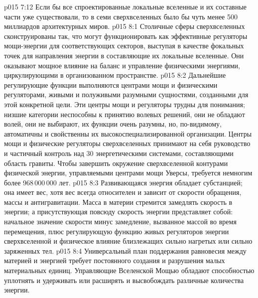 \vs p015 7:12 \pc Если бы все спроектированные локальные вселенные и их составные части уже существовали, то в семи сверхвселенных было бы чуть менее 500 миллиардов архитектурных миров.
\vs p015 8:1 Столичные сферы сверхвселенных сконструированы так, что могут функционировать как эффективные регуляторы мощи\hyp{}энергии для соответствующих секторов, выступая в качестве фокальных точек для направления энергии в составляющие их локальные вселенные. Они оказывают мощное влияние на баланс и управление физическими энергиями, циркулирующими в организованном пространстве.
\vs p015 8:2 Дальнейшие регулирующие функции выполняются центрами мощи и физическими регуляторами, живыми и полуживыми разумными сущностями, созданными для этой конкретной цели. Эти центры мощи и регуляторы трудны для понимания; низшие категории неспособны к принятию волевых решений, они не обладают волей, они не выбирают, их функции очень разумны, но, по\hyp{}видимому, автоматичны и свойственны их высокоспециализированной организации. Центры мощи и физические регуляторы сверхвселенных принимают на себя руководство и частичный контроль над 30 энергетическими системами, составляющими область гравиты. Чтобы завершить окружение сверхвселенной контурами физической энергии, управляемыми центрами мощи Уверсы, требуется немногим более 968\,000\,000 лет.
\vs p015 8:3 \pc Развивающаяся энергия обладает субстанцией; она имеет вес, хотя вес всегда относителен и зависит от скорости обращения, массы и антигравитации. Масса в материи стремится замедлять скорость в энергии; а присутствующая повсюду скорость энергии представляет собой: начальное значение скорости минус замедление, вызванное массой во время перемещения, плюс регулирующую функцию живых регуляторов энергии сверхвселенной и физическое влияние близлежащих сильно нагретых или сильно заряженных тел.
\vs p015 8:4 Универсальный план поддержания равновесия между материей и энергией требует постоянного создания и разрушения малых материальных единиц. Управляющие Вселенской Мощью обладают способностью уплотнять и удерживать или расширять и высвобождать различные количества энергии.
